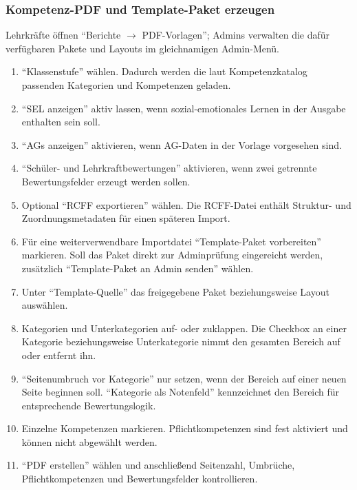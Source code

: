 \documentclass[12pt,a4paper]{article}
\begin{document}
\subsubsection{Kompetenz-PDF und Template-Paket erzeugen}\label{sec:latex-auswahl}
Lehrkräfte öffnen \enquote{Berichte \(\rightarrow\) PDF-Vorlagen}; Admins verwalten die dafür verfügbaren Pakete und Layouts im gleichnamigen Admin-Menü.

\begin{enumerate}
  \item \enquote{Klassenstufe} wählen. Dadurch werden die laut Kompetenzkatalog passenden Kategorien und Kompetenzen geladen.
  \item \enquote{SEL anzeigen} aktiv lassen, wenn sozial-emotionales Lernen in der Ausgabe enthalten sein soll.
  \item \enquote{AGs anzeigen} aktivieren, wenn AG-Daten in der Vorlage vorgesehen sind.
  \item \enquote{Schüler- und Lehrkraftbewertungen} aktivieren, wenn zwei getrennte Bewertungsfelder erzeugt werden sollen.
  \item Optional \enquote{RCFF exportieren} wählen. Die RCFF-Datei enthält Struktur- und Zuordnungsmetadaten für einen späteren Import.
  \item Für eine weiterverwendbare Importdatei \enquote{Template-Paket vorbereiten} markieren. Soll das Paket direkt zur Adminprüfung eingereicht werden, zusätzlich \enquote{Template-Paket an Admin senden} wählen.
  \item Unter \enquote{Template-Quelle} das freigegebene Paket beziehungsweise Layout auswählen.
  \item Kategorien und Unterkategorien auf- oder zuklappen. Die Checkbox an einer Kategorie beziehungsweise Unterkategorie nimmt den gesamten Bereich auf oder entfernt ihn.
  \item \enquote{Seitenumbruch vor Kategorie} nur setzen, wenn der Bereich auf einer neuen Seite beginnen soll. \enquote{Kategorie als Notenfeld} kennzeichnet den Bereich für entsprechende Bewertungslogik.
  \item Einzelne Kompetenzen markieren. Pflichtkompetenzen sind fest aktiviert und können nicht abgewählt werden.
  \item \enquote{PDF erstellen} wählen und anschließend Seitenzahl, Umbrüche, Pflichtkompetenzen und Bewertungsfelder kontrollieren.
\end{enumerate}
\end{document}
